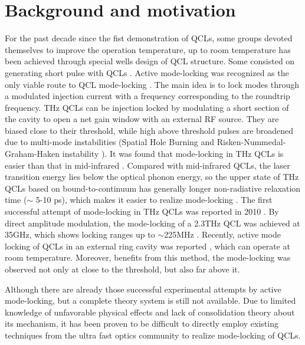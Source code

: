 \documentclass[11pt,final]{scrbook}
\begin{document}
\section{Background and motivation}
For the past decade since the fist demonstration of QCLs, some groups devoted themselves to improve the operation temperature, up to room temperature has been achieved \cite{bai2011room} through special wells design of QCL structure. Some consisted on generating short pulse with QCLs \cite{wang2009mode}. Active mode-locking was recognized as the only viable route to QCL mode-locking \cite{revin2016active}. The main idea is to lock modes through a modulated injection current with a frequency corresponding to the roundtrip frequency. THz QCLs can be injection locked by modulating a short section of the cavity to open a net gain window with an external RF source. They are biased close to their threshold, while high above threshold pulses are broadened due to multi-mode instabilities (Spatial Hole Burning and Risken-Nummedal-Graham-Haken instability \cite{vukovic2016low}). It was found that mode-locking in THz QCLs is easier than that in mid-infrared \cite{wang2009mode}. Compared with mid-infrared QCLs, the laser transition energy lies below the optical phonon energy, so the upper state of THz QCLs based on bound-to-continuum has generally longer non-radiative relaxation time ($\sim$ 5-10 ps), which makes it easier to realize mode-locking \cite{barbieri2011coherent}. The first successful attempt of mode-locking in THz QCLs was reported in 2010 \cite{gellie2010injection}. By direct amplitude modulation, the mode-locking of a 2.3THz QCL was achieved at 35GHz, which shows locking ranges up to $\sim$225MHz  \cite{gellie2010injection}. Recently, active mode locking of QCLs in an external ring cavity was reported \cite{revin2016active}, which can operate at room temperature. Moreover, benefits from this method, the mode-locking was observed not only at close to the threshold, but also far above it. 

Although there are already those successful experimental attempts by active mode-locking, but a complete theory system is still not available. Due to limited knowledge of unfavorable physical effects and lack of consolidation theory about its mechanism, it has been proven to be difficult to directly employ existing techniques from the ultra fast optics community to realize mode-locking of QCLs.
\end{document}
